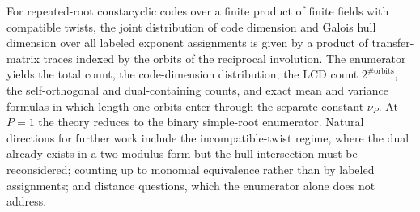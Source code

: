 \documentclass[10pt,journal,draftclsnofoot,onecolumn]{IEEEtran}
\theoremstyle{definition}
\theoremstyle{remark}
\begin{document}
For repeated-root constacyclic codes over a finite product of finite
fields with compatible twists, the joint distribution of code dimension and
Galois hull dimension over all labeled exponent assignments is given by
a product of transfer-matrix traces indexed by the orbits of the
reciprocal involution. The enumerator yields the total count, the
code-dimension distribution, the LCD count \(2^{\#\mathrm{orbits}}\), the
self-orthogonal and dual-containing counts, and exact mean and variance
formulas in which length-one orbits enter through the separate constant
\(\nu_P\). At \(P=1\) the theory reduces to the binary simple-root
enumerator. Natural directions for further work include the
incompatible-twist regime, where the dual already exists in a
two-modulus form but the hull intersection must be reconsidered;
counting up to monomial equivalence rather than by labeled assignments;
and distance questions, which the enumerator alone does not address.
\end{document}
